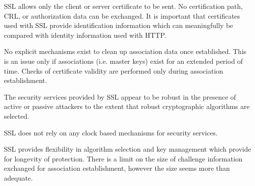   
  SSL allows only the client or server certificate to be sent. No
  certification path, CRL, or authorization data can be exchanged. It is
  important that certificates used with SSL provide identification
  information which can meaningfully be compared with identity information
  used with HTTP.

  
  No explicit mechanisms exist to clean up association data once
  established.  This is an issue only if associations (i.e. master keys)
  exist for an extended period of time. Checks of certificate validity are
  performed only during association establishment.

  
  The security services provided by SSL appear to be robust in the presence
  of active or passive attackers to the extent that robust cryptographic
  algorithms are selected.

  
  SSL does not rely on any clock based mechanisms for security services.

  
  SSL provides flexibility in algorithm selection and key management which
  provide for longevity of protection. There is a limit on the size of
  challenge information exchanged for association establishment, however
  the size seems more than adequate.

  
